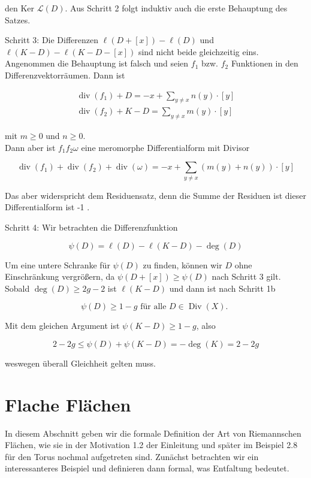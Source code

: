 \documentclass[10pt, letterpaper]{article}
\begin{document}
den Ker $\mathcal{L}(D)$. Aus Schritt 2 folgt induktiv auch die erste Behauptung des Satzes.

Schritt 3: Die Differenzen $\ell(D+[x])-\ell(D)$ und $\ell(K-D)-\ell(K-D-[x])$ sind nicht beide gleichzeitig eins.\\
Angenommen die Behauptung ist falsch und seien $f_{1}$ bzw. $f_{2}$ Funktionen in den Differenzvektorräumen. Dann ist

$$
\begin{gathered}
\operatorname{div}\left(f_{1}\right)+D=-x+\sum_{y \neq x} n(y) \cdot[y] \\
\operatorname{div}\left(f_{2}\right)+K-D=\sum_{y \neq x} m(y) \cdot[y]
\end{gathered}
$$

mit $m \geqslant 0$ und $n \geqslant 0$.\\
Dann aber ist $f_{1} f_{2} \omega$ eine meromorphe Differentialform mit Divisor

$$
\operatorname{div}\left(f_{1}\right)+\operatorname{div}\left(f_{2}\right)+\operatorname{div}(\omega)=-x+\sum_{y \neq x}(m(y)+n(y)) \cdot[y]
$$

Das aber widerspricht dem Residuensatz, denn die Summe der Residuen ist dieser Differentialform ist -1 .

Schritt 4: Wir betrachten die Differenzfunktion

$$
\psi(D)=\ell(D)-\ell(K-D)-\operatorname{deg}(D)
$$

Um eine untere Schranke für $\psi(D)$ zu finden, können wir $D$ ohne Einschränkung vergrößern, da $\psi(D+[x]) \geqslant \psi(D)$ nach Schritt 3 gilt. Sobald $\operatorname{deg}(D) \geqslant 2 g-2$ ist $\ell(K-D)$ und dann ist nach Schritt 1b

$$
\psi(D) \geqslant 1-g \text { für alle } D \in \operatorname{Div}(X) \text {. }
$$

Mit dem gleichen Argument ist $\psi(K-D) \geqslant 1-g$, also

$$
2-2 g \leqslant \psi(D)+\psi(K-D)=-\operatorname{deg}(K)=2-2 g
$$

weswegen überall Gleichheit gelten muss.

\section {Flache Flächen}
In diesem Abschnitt geben wir die formale Definition der Art von Riemannschen Flächen, wie sie in der Motivation 1.2 der Einleitung und später im Beispiel 2.8 für den Torus nochmal aufgetreten sind. Zunächst betrachten wir ein interessanteres Beispiel und definieren dann formal, was Entfaltung bedeutet.
\end{document}
